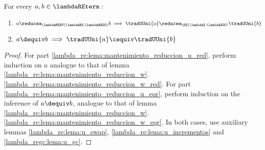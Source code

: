 \begin{lemma}\label{lambda_re:lema:mantenimiento_reduccion_u}
For every $a, b \in \lambdaREterm :$
    \begin{enumerate}
        \item \label{lambda_re:lema:mantenimiento_reduccion_u_red} $a \reducea_{\lambdaREXP (\lambdaRE, \lambdaREGC)} b \implies \tradUUni{a} \reducea_{\BX (\lambdaX, \lambdaXGC)} \tradUUni{b}$
        \item \label{lambda_re:lema:mantenimiento_reduccion_u_eqr} $a \dequiv b \implies \tradUUni{a} \cequiv \tradUUni{b}$
    \end{enumerate}
    
    \begin{proof}
    For part \ref{lambda_re:lema:mantenimiento_reduccion_u_red}, perform induction on $a$ analogue to that
    of lemma \ref{lambda_re:lema:mantenimiento_reduccion_w}.\ref{lambda_re:lema:mantenimiento_reduccion_w_red}. 
    For part \ref{lambda_re:lema:mantenimiento_reduccion_u_eqr}, perform induction on the inference of $a \dequiv b$, analogue to
    that of lemma \ref{lambda_re:lema:mantenimiento_reduccion_w}.\ref{lambda_re:lema:mantenimiento_reduccion_w_eqr}. In both cases,
    use auxiliary lemmas \ref{lambda_re:lema:u_swap}, \ref{lambda_re:lema:u_incrementos} and \ref{lambda_regc:lema:u_gc}.
    \end{proof}

\end{lemma}
